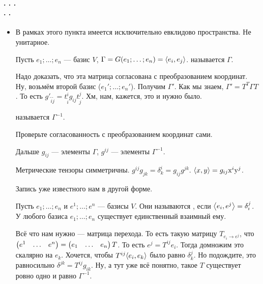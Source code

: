 \documentclass{article}
\begin{document}
    \paragraph{. . . \\. .}
    \begin{itemize}
        \item[]
        \begin{Comment}
            В рамках этого пункта имеется исключительно евклидово пространства. Не унитарное.
        \end{Comment}
        \dfn Пусть $e_1;\ldots;e_n$ --- базис $V$, $\Gamma=G(e_1;\ldots;e_n)={\left\langle{e_i},{e_j}\right\rangle}$.  называется $\Gamma$.
        \begin{Proof}
            Надо доказать, что эта матрица согласована с преобразованием координат. Ну, возьмём второй базис ($e_1';\ldots;e_n'$). Получим $\Gamma'$. Как мы знаем, $\Gamma'=T^T\Gamma T$. То есть $g'_{\widetilde i\widetilde j}=t^i_{\widetilde i}g_{ij}t^j_{\widetilde j}$. Хм, нам, кажется, это и нужно было.
        \end{Proof}
        \dfn {} называется $\Gamma^{-1}$.
        \begin{Proof}
            Проверьте согласованность с преобразованием координат сами.
        \end{Proof}
        \begin{Comment}
            Дальше $g_{ij}$ --- элементы $\Gamma$, $g^{ij}$ --- элементы $\Gamma^{-1}$.
        \end{Comment}
        \thm Метрические тензоры симметричны.
        \thm $g^{ij}g_{jk}=\delta^i_k=g_{ij}g^{jk}$.
        \thm ${\left\langle{x},{y}\right\rangle}=g_{ij}\mathrm x^i\mathrm y^j$.
        \begin{Proof}
            Запись уже известного нам в другой форме.
        \end{Proof}
        \dfn Пусть $e_1;\ldots;e_n$ и $e^1;\ldots;e^n$ --- базисы $V$. Они называются , если ${\left\langle{e_i},{e^j}\right\rangle}=\delta_i^j$.
        \thm У любого базиса $e_1;\ldots;e_n$ существует единственный взаимный ему.
        \begin{Proof}
            Всё что нам нужно --- матрица перехода. То есть такую матрицу $T_{e_i\to e^j}$, что $\left(\begin{matrix}e^1&\ldots&e^n\end{matrix}\right)=\left(\begin{matrix}e_1&\ldots&e_n\end{matrix}\right)T$. То есть $e^j=T^{ij}e_i$. Тогда домножим это скалярно на $e_k$. Хочется, чтобы $T^{ij}{\left\langle{e_i},{e_k}\right\rangle}$ было равно $\delta^j_k$. Но подождите, это равносильно $\delta^{jk}=T^{ij}g_{ik}$. Ну, а тут уже всё понятно, такое $T$ существует ровно одно и равно $\Gamma^{-1}$.

\end{Proof}
\end{itemize}
\end{document}

